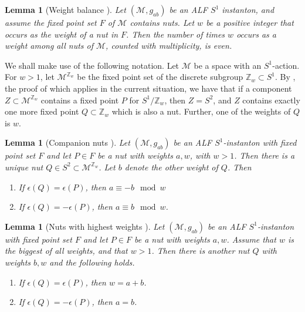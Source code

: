 \documentclass[a4paper,10pt,reqno]{amsart}
\newcommand{\nut}{P}
\newcommand{\cM}{\mathcal{M}}
\theoremstyle{plain}
\newtheorem{lemma}[thm]{Lemma}
\newcommand{\Zbb}{\mathbb{Z}}
\numberwithin{equation}{section}
\newcommand{\eps}{\epsilon}
\newcommand{\Fixed}{F}
\begin{document}
\begin{lemma}[Weight balance ] \label{lem:2.6} Let $(\cM, g_{ab})$ be an ALF $S^1$ instanton, and assume the fixed point set $\Fixed$ of $\cM$ contains nuts. Let $w$ be a positive integer that occurs as the weight of a nut in $\Fixed$. Then the number of times $w$ occurs as a weight among all nuts of $\cM$, counted with multiplicity, is even. 
\end{lemma} 
We shall make use of the following notation. Let $\cM$ be a space with an $S^1$-action. For $w >1$, let $\cM^{\Zbb_w}$ be the fixed point set of the discrete subgroup $\Zbb_w \subset S^1$. By \cite[Lemma 2.2]{2018JGP...133..181J}, the proof of which applies in the current situation,  we have that if a component $Z \subset \cM^{\Zbb_w}$ contains a fixed point $\nut$ for $S^1/\Zbb_w$, then $Z = S^2$, and $Z$ contains exactly one more fixed point $Q \subset \Zbb_w$ which is also a nut. Further, one of the weights of $Q$ is $w$. 
\begin{lemma}[Companion nuts ] \label{lem:3.5}
Let $(\cM, g_{ab})$ be an ALF $S^1$-instanton with fixed point set $\Fixed$ and let $\nut \in \Fixed$ be a nut with weights $a,w$, with $w > 1$. Then there is a unique nut $Q \in S^2 \subset \cM^{\Zbb_w}$. Let $b$ denote the other weight of $Q$. Then 
\begin{enumerate} 
\item If $\eps(Q) = \eps(\nut)$, then $a \equiv -b \mod w$
\item If $\eps(Q) = - \eps(\nut)$, then $a \equiv b \mod w$. 
\end{enumerate} 
\end{lemma} 

\begin{lemma}[Nuts with highest weights ] 
\label{lem:3.6}
Let $(\cM, g_{ab})$ be an ALF $S^1$-instanton with fixed point set $\Fixed$ and let $\nut \in \Fixed$ be a nut with weights $a,w$. Assume that $w$ is the biggest of all weights, and that $w>1$. Then there is another nut $Q$ with weights $b,w$ and the following holds.  
\begin{enumerate} 
\item If $\eps(Q) = \eps(\nut)$, then $w=a+b$.
\item If $\eps(Q) = - \eps(\nut)$, then $a=b$.
\end{enumerate} 
\end{lemma} 
\end{document}
